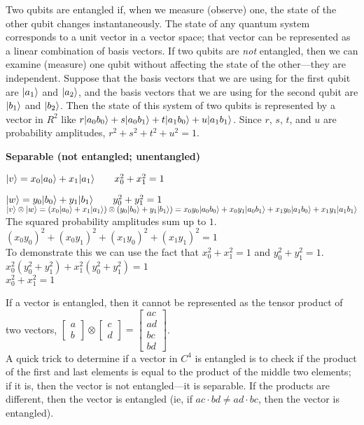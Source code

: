 
Two qubits are entangled if, when we measure (observe) one, the state of the other qubit changes instantaneously. The state of any quantum system corresponds to a unit vector in a vector space; that vector can be represented as a linear combination of basis vectors. If two qubits are \emph{not} entangled, then we can examine (measure) one qubit without affecting the state of the other---they are independent. Suppose that the basis vectors that we are using for the first qubit are $\lvert a_1\rangle$ and $\lvert a_2\rangle$, and the basis vectors that we are using for the second qubit are $\lvert b_1\rangle$ and $\lvert b_2\rangle$. Then the state of this system of two qubits is represented by a vector in $R^2$ like $r\lvert a_0 b_0\rangle + s\lvert a_0 b_1\rangle + t\lvert a_1 b_0\rangle + u\lvert a_1 b_1\rangle$. Since $r$, $s$, $t$, and $u$ are probability amplitudes, $r^2 + s^2 + t^2 + u^2 = 1$.

\begin{example}
    \textbf{Separable (not entangled; unentangled)}
    
    $\lvert v\rangle = x_0\lvert a_0\rangle + x_1\lvert a_1\rangle \qquad x_0^2 +x_1^2 = 1$

    $\lvert w\rangle = y_0\lvert b_0\rangle + y_1\lvert b_1\rangle \qquad y_0^2 +y_1^2 = 1$\\

    $\lvert v\rangle \otimes \lvert w\rangle = (x_0\lvert a_0\rangle + x_1\lvert a_1\rangle) \otimes (y_0\lvert b_0\rangle + y_1\lvert b_1\rangle) = x_0y_0\lvert a_0 b_0\rangle + x_0y_1\lvert a_0 b_1\rangle + x_1y_0\lvert a_1 b_0\rangle + x_1y_1\lvert a_1 b_1\rangle$\\

    The squared probability amplitudes sum up to $1$.\\
    $(x_0 y_0)^2 + (x_0 y_1)^2 + (x_1 y_0)^2 + (x_1 y_1)^2 = 1$\\
    To demonstrate this we can use the fact that $x_0^2 + x_1^2 = 1$ and $y_0^2 + y_1^2 = 1$.\\
    $x_0^2(y_0^2 + y_1^2) + x_1^2(y_0^2 + y_1^2) = 1$\\
    $x_0^2 + x_1^2 = 1$
\end{example}

If a vector is entangled, then it cannot be represented as the tensor product of two vectors, $\begin{bmatrix}
    a\\
    b
\end{bmatrix} \otimes \begin{bmatrix}
    c\\
    d
\end{bmatrix} = \begin{bmatrix}
    ac\\
    ad\\
    bc\\
    bd
\end{bmatrix}$.\\
A quick trick to determine if a vector in $C^4$ is entangled is to check if the product of the first and last elements is equal to the product of the middle two elements; if it is, then the vector is not entangled---it is separable. If the products are different, then the vector is entangled (ie, if $ac \cdot bd \neq ad \cdot bc$, then the vector is entangled).

